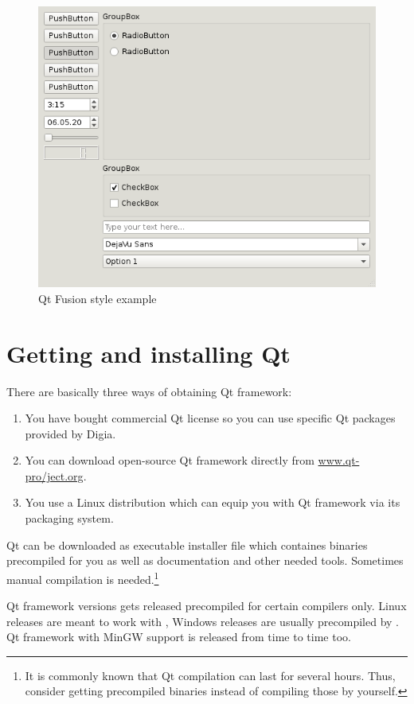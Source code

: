 \begin{figure}[ht]
\centering\includegraphics{graphics/laboratory/01-fusion.png}
\caption{Qt Fusion style example}\label{figure:fusion}
\end{figure}

\section{Getting and installing Qt}
There are basically three ways of obtaining Qt framework:
\begin{enumerate}
\item You have bought commercial Qt license so you can use specific Qt packages provided by Digia.
\item You can download open-source Qt framework directly from \href{http://www.qt-project.org/}{www.qt-pro\-/ject.org}.
\item You use a Linux distribution which can equip you with Qt framework via its packaging system.
\end{enumerate}

Qt can be downloaded as executable installer file which containes binaries precompiled for you as well as documentation and other needed tools. Sometimes manual compilation is needed.\footnote{It is commonly known that Qt compilation can last for several hours. Thus, consider getting precompiled binaries instead of compiling those by yourself.}

Qt framework versions gets released precompiled for certain compilers only. Linux releases are meant to work with , Windows releases are usually precompiled by . Qt framework with MinGW support is released from time to time too.

